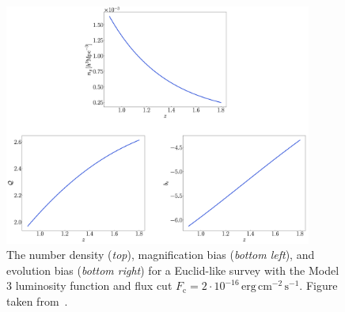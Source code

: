 \begin{figure}[!ht]
    \centering
    \includegraphics[width=0.9\textwidth]{fig/model3ngbeq.png}
    \caption{The number density (\emph{top}), magnification bias (\emph{bottom left}), and evolution bias (\emph{bottom right}) for a Euclid-like survey with the Model 3 luminosity function and flux cut $F_\mathrm{c} = 2 \cdot 10^{-16}\,\mathrm{erg}\,\mathrm{cm}^{-2}\,\mathrm{s}^{-1}$. Figure taken from~\cite{Maartens:2021dqy}.}
    \label{fig:model3ngbeq}
\end{figure}

